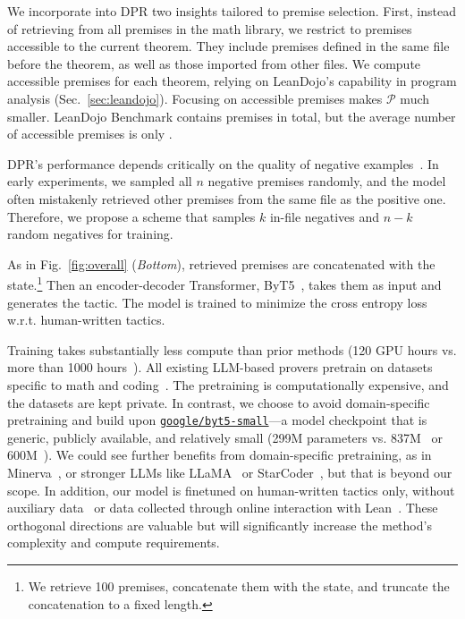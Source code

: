  We incorporate into DPR two insights tailored to premise selection.
First, instead of retrieving from all premises in the math library, we restrict to premises accessible to the current theorem. They include premises defined in the same file before the theorem, as well as those imported from other files. We compute accessible premises for each theorem, relying on LeanDojo's capability in program analysis (Sec.~\ref{sec:leandojo}). Focusing on accessible premises makes $\mathcal{P}$ much smaller. LeanDojo Benchmark contains {\numpremises} premises in total, but the average number of accessible premises is only {\numaccessiblepremises}.

DPR's performance depends critically on the quality of negative examples~\cite{zhan2021optimizing,lu2021multi}. In early experiments, we sampled all $n$ negative premises randomly, and the model often mistakenly retrieved other premises from the same file as the positive one. Therefore, we propose a scheme that samples $k$ in-file negatives and $n-k$ random negatives for training.



As in Fig.~\ref{fig:overall} (\emph{Bottom}), retrieved premises are concatenated with the state.\footnote{We retrieve 100 premises, concatenate them with the state, and truncate the concatenation to a fixed length.} Then an encoder-decoder Transformer, ByT5~\cite{xue2022byt5}, takes them as input and generates the tactic. The model is trained to minimize the cross entropy loss w.r.t. human-written tactics.

Training {\name} takes substantially less compute than prior methods (120 GPU hours vs. more than 1000 hours~\cite{han2022proof,lample2022hypertree}). All existing LLM-based provers pretrain on datasets specific to math and coding~\cite{polu2020generative,jiang2021lisa,han2022proof,lample2022hypertree,jiang2022thor,polu2023formal,first2023baldur}. The pretraining is computationally expensive, and the datasets are kept private. In contrast, we choose to avoid domain-specific pretraining and build upon \href{https://huggingface.co/google/byt5-small}{\texttt{google/byt5-small}}---a model checkpoint that is generic, publicly available, and relatively small (299M parameters vs. 837M~\cite{han2022proof} or 600M~\cite{lample2022hypertree}). We could see further benefits from domain-specific pretraining, as in Minerva~\cite{lewkowycz2022solving}, or stronger LLMs like LLaMA~\cite{touvron2023llama} or StarCoder~\cite{li2023starcoder}, but that is beyond our scope. In addition, our model is finetuned on human-written tactics only, without auxiliary data~\cite{han2022proof} or data collected through online interaction with Lean~\cite{polu2023formal,lample2022hypertree}. These orthogonal directions are valuable but will significantly increase the method's complexity and compute requirements.

